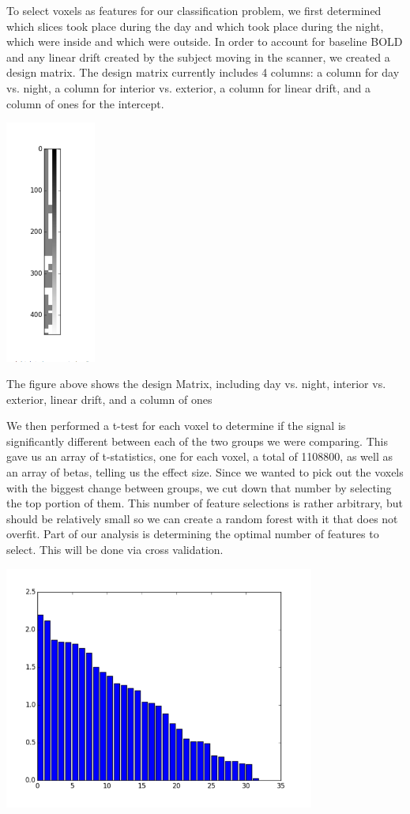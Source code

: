 \documentclass[11pt]{article}
\begin{document}
To select voxels as features for our classification problem, we first
determined which slices took place during the day and which took place during
the night, which were inside and which were outside.  In order to account for
baseline BOLD and any linear drift created by the subject moving in the
scanner, we created a design matrix.  The design matrix currently includes 4
columns: a column for day vs. night, a column for interior vs. exterior, a
column for linear drift, and a column of ones for the intercept.

\begin{center}
\includegraphics[height=8cm]{2}
\end{center}

The figure above shows the design Matrix, including day vs. night, interior vs. exterior, linear drift, and a column of ones

We then performed a t-test for each voxel to determine if the signal is
significantly different between each of the two groups we were comparing.
This gave us an array of t-statistics, one for each voxel, a total of 1108800,
as well as an array of betas, telling us the effect size.  Since we wanted to
pick out the voxels with the biggest change between groups, we cut down that
number by selecting the top portion of them.  This number of feature
selections is rather arbitrary, but should be relatively small so we can
create a random forest with it that does not overfit.  Part of our analysis is
determining the optimal number of features to select. This will be done via
cross validation.

\begin{center}
\includegraphics[height=8cm]{3}
\end{center}
\end{document}
